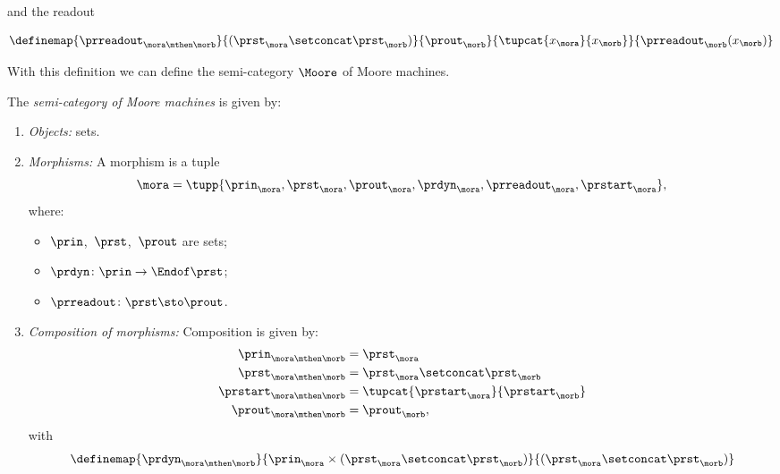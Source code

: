 and the readout

\begin{equation}\label{eq:moore-comp-good-3}
  \definemap{
    \prreadout_{\mora\mthen\morb}
    }{
      (\prst_{\mora} \setconcat \prst_{\morb})
    }{
      \prout_{\morb}
    }{
      \tupcat{x_{\mora}}{x_{\morb}}
    }{
      \prreadout_{\morb}(x_{\morb})
    }
\end{equation}


With this definition we can define the semi-category $\Moore$ of Moore machines.

\begin{definition}[\Moore]
  \label{def:Moore}
  The \emph{semi-category of Moore machines} \Moore is given by:
  \begin{enumerate}
    \item \emph{Objects:} sets.
    \item \emph{Morphisms:} A morphism is a tuple
    \begin{equation}
    \mora = \tupp{\prin_{\mora},\prst_{\mora},\prout_{\mora},\prdyn_{\mora},\prreadout_{\mora},\prstart_{\mora}},
    \end{equation}
    where:
    \begin{itemize}
      \item $\prin$,~$\prst$,~$\prout$ are sets;
      \item $ \prdyn \colon \prin \to \Endof \prst$;
      \item $ \prreadout \colon \prst \sto \prout$.
  \end{itemize}
    \item \emph{Composition of morphisms:} Composition is given by:
    \begin{equation}
      \begin{aligned}
      \prin_{\mora\mthen\morb} &= \prst_{\mora}   \\
      \prst_{\mora\mthen\morb} &= \prst_{\mora} \setconcat \prst_{\morb} \\
      \prstart_{\mora\mthen\morb} &= \tupcat{\prstart_{\mora}}{\prstart_{\morb}} \\
      \prout_{\mora\mthen\morb} &= \prout_{\morb},
      \end{aligned}
    \end{equation}
    with
    \begin{equation}
      \label{eq:moore_dyn_comp}
      \definemap{
        \prdyn_{\mora\mthen\morb}
        }{
          \prin_{\mora} \times (\prst_{\mora} \setconcat \prst_{\morb})
        }{
          (\prst_{\mora} \setconcat \prst_{\morb})
}
\end{equation}
\end{enumerate}
\end{definition}
